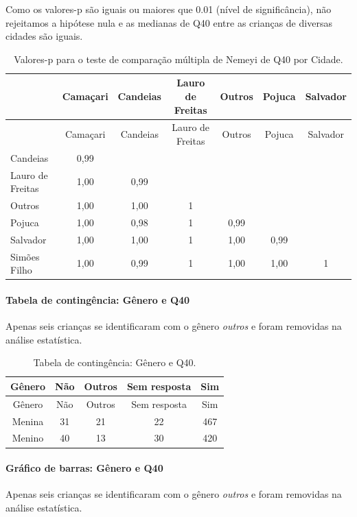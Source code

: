 \documentclass[]{article}
\let\oldparagraph\paragraph
\renewcommand{\paragraph}[1]{\oldparagraph{#1}\mbox{}}
\begin{document}
Como os valores-p são iguais ou maiores que 0.01 (nível de significância), não rejeitamos a hipótese nula e as medianas de Q40 entre as crianças de diversas cidades são iguais.

\begin{longtable}[]{@{}lcccccc@{}}
\caption{\label{tab:unnamed-chunk-1555}Valores-p para o teste de comparação múltipla de Nemeyi de Q40 por Cidade.}\tabularnewline
\toprule
& Camaçari & Candeias & Lauro de Freitas & Outros & Pojuca & Salvador\tabularnewline
\midrule
\endfirsthead
\toprule
& Camaçari & Candeias & Lauro de Freitas & Outros & Pojuca & Salvador\tabularnewline
\midrule
\endhead
Candeias & 0,99 & & & & &\tabularnewline
Lauro de Freitas & 1,00 & 0,99 & & & &\tabularnewline
Outros & 1,00 & 1,00 & 1 & & &\tabularnewline
Pojuca & 1,00 & 0,98 & 1 & 0,99 & &\tabularnewline
Salvador & 1,00 & 1,00 & 1 & 1,00 & 0,99 &\tabularnewline
Simões Filho & 1,00 & 0,99 & 1 & 1,00 & 1,00 & 1\tabularnewline
\bottomrule
\end{longtable}

\cleardoublepage

\hypertarget{tabela-de-continguxeancia-guxeanero-e-q40}{%
\paragraph{Tabela de contingência: Gênero e Q40}\label{tabela-de-continguxeancia-guxeanero-e-q40}}

Apenas seis crianças se identificaram com o gênero \emph{outros} e foram removidas na análise estatística.

\begin{longtable}[]{@{}ccccc@{}}
\caption{\label{tab:unnamed-chunk-1556}Tabela de contingência: Gênero e Q40.}\tabularnewline
\toprule
Gênero & Não & Outros & Sem resposta & Sim\tabularnewline
\midrule
\endfirsthead
\toprule
Gênero & Não & Outros & Sem resposta & Sim\tabularnewline
\midrule
\endhead
Menina & 31 & 21 & 22 & 467\tabularnewline
Menino & 40 & 13 & 30 & 420\tabularnewline
\bottomrule
\end{longtable}

\hypertarget{gruxe1fico-de-barras-guxeanero-e-q40}{%
\paragraph{Gráfico de barras: Gênero e Q40}\label{gruxe1fico-de-barras-guxeanero-e-q40}}

Apenas seis crianças se identificaram com o gênero \emph{outros} e foram removidas na análise estatística.
\end{document}

